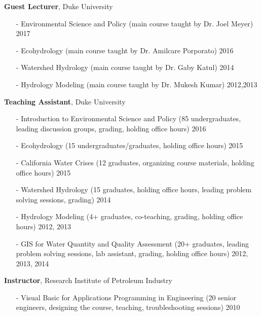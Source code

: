 \documentclass[10pt]{article}
\newenvironment{changemargin}[2]{%
  \begin{list}{}{%
    \setlength{\topsep}{0pt}%
    \setlength{\leftmargin}{#1}%
    \setlength{\rightmargin}{#2}%
    \setlength{\listparindent}{\parindent}%
    \setlength{\itemindent}{\parindent}%
    \setlength{\parsep}{\parskip}%
  }%
  \item[]}{\end{list}
}
\newenvironment{body} {
	\vspace*{-2pt}
	\begin{changemargin}{-0.5in}{-0.5in}
  }
	{\end{changemargin}
}
\begin{document}
\begin{body}
  \textbf {Guest Lecturer}, Duke University\\
	\vspace*{-4pt}
		\begin{itemize} \itemsep -0pt
		
		  \item[-]Environmental Science and Policy (main course taught by Dr. Joel Meyer)  \hfill {2017}
  		\item[-]Ecohydrology (main course taught by Dr. Amilcare Porporato)  \hfill {2016}
  		\item[-]Watershed Hydrology (main course taught by Dr. Gaby Katul)  \hfill {2014}
  		\item[-]Hydrology Modeling (main course taught by Dr. Mukesh Kumar)  \hfill {2012,2013}
  	\end{itemize}
\medskip


  \textbf {Teaching Assistant}, Duke University\\
	\vspace*{-4pt}
		\begin{itemize} \itemsep -0pt
  		\item[-]Introduction to Environmental Science and Policy (85 undergraduates, leading discussion groups, grading, holding office hours) \hfill {2016}
  		\item[-]Ecohydrology (15 undergraduates/graduates, holding office hours) \hfill {2015}
  		\item[-]California Water Crises (12 graduates, organizing course materials, holding office hours) \hfill {2015}
  		\item[-]Watershed Hydrology (15 graduates, holding office hours, leading problem solving sessions, grading) \hfill {2014}
  		\item[-]Hydrology Modeling (4+ graduates, co-teaching, grading, holding office hours) \hfill {2012, 2013}
  		\item[-]GIS for Water Quantity and Quality Assessment (20+ graduates, leading problem solving sessions, lab assistant, grading, holding office hours) \hfill {2012, 2013, 2014}
  	\end{itemize}

\medskip

	\textbf {Instructor}, Research Institute of Petroleum Industry\\
	\vspace*{-4pt}
			\begin{itemize} \itemsep -0pt
    	  \item[-]Visual Basic for Applications Programming in Engineering (20 senior engineers, designing the course, teaching,  troubleshooting sessions)  \hfill {2010}
    	\end{itemize}
\medskip


\end{body}
\end{document}
